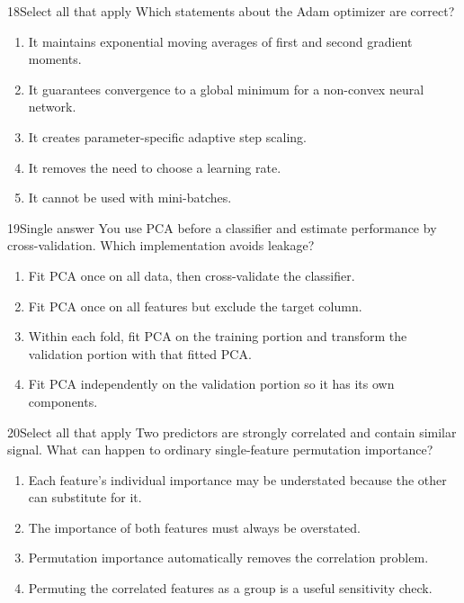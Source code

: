 \documentclass[10pt,a4paper]{article}
\begin{document}
\begin{questionbox}{18}{Select all that apply}
Which statements about the Adam optimizer are correct?
\begin{enumerate}
  \item It maintains exponential moving averages of first and second gradient moments.
  \item It guarantees convergence to a global minimum for a non-convex neural network.
  \item It creates parameter-specific adaptive step scaling.
  \item It removes the need to choose a learning rate.
  \item It cannot be used with mini-batches.
\end{enumerate}
\end{questionbox}

\begin{questionbox}{19}{Single answer}
You use PCA before a classifier and estimate performance by cross-validation. Which implementation avoids leakage?
\begin{enumerate}
  \item Fit PCA once on all data, then cross-validate the classifier.
  \item Fit PCA once on all features but exclude the target column.
  \item Within each fold, fit PCA on the training portion and transform the validation portion with that fitted PCA.
  \item Fit PCA independently on the validation portion so it has its own components.
\end{enumerate}
\end{questionbox}

\begin{questionbox}{20}{Select all that apply}
Two predictors are strongly correlated and contain similar signal. What can happen to ordinary single-feature permutation importance?
\begin{enumerate}
  \item Each feature's individual importance may be understated because the other can substitute for it.
  \item The importance of both features must always be overstated.
  \item Permutation importance automatically removes the correlation problem.
  \item Permuting the correlated features as a group is a useful sensitivity check.
\end{enumerate}
\end{questionbox}
\end{document}
